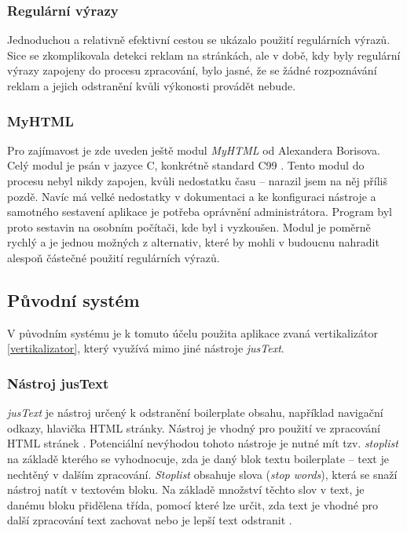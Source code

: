 \subsubsection{Regulární výrazy}
Jednoduchou a relativně efektivní cestou se ukázalo použití regulárních výrazů. Sice se zkomplikovala detekci reklam na stránkách,
ale v době, kdy byly regulární výrazy zapojeny do procesu zpracování, bylo jasné, že se žádné rozpoznávání reklam
a jejich odstranění kvůli výkonosti provádět nebude.

\subsubsection{MyHTML}
Pro zajímavost je zde uveden ještě modul \textit{MyHTML} od Alexandera Borisova. Celý modul je psán v jazyce C,
konkrétně standard C99 \cite{MyHTML}. Tento modul do procesu nebyl nikdy zapojen, kvůli nedostatku času -- narazil jsem na něj
příliš pozdě. Navíc má velké nedostatky v dokumentaci a ke konfiguraci nástroje a samotného sestavení aplikace je
potřeba oprávnění administrátora. Program byl proto sestavin na osobním počítači, kde byl i vyzkoušen. Modul je poměrně rychlý
a je jednou možných z alternativ, které by mohli v budoucnu nahradit alespoň částečné použití regulárních výrazů.

\subsection{Původní systém}
V původním systému je k tomuto účelu použita aplikace zvaná vertikalizátor \ref{vertikalizator}, který využívá
mimo jiné nástroje \textit{jusText}.

\subsubsection{Nástroj jusText}
\textit{jusText} je nástroj určený k odstranění boilerplate obsahu, například navigační odkazy, hlavička HTML stránky.
Nástroj je vhodný pro použití ve zpracování HTML stránek \cite{JUSTEXT}. Potenciální nevýhodou tohoto nástroje je nutné mít tzv. \textit{stoplist}
na základě kterého se vyhodnocuje, zda je daný blok textu boilerplate -- text je nechtěný v dalším zpracování. \textit{Stoplist}
obsahuje slova (\textit{stop words}), která se snaží nástroj natít v textovém bloku. Na základě množství těchto slov v text,
je danému bloku přidělena třída, pomocí které lze určit, zda text je vhodné pro další zpracování text zachovat nebo je lepší
text odstranit \cite{JUSTEXT_ALG}.



